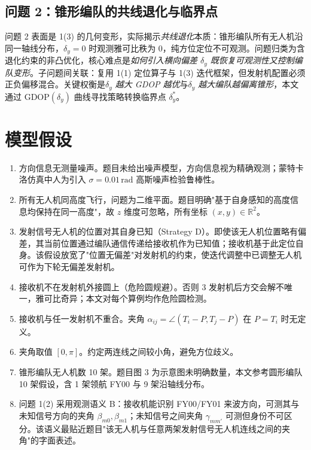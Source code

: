 \documentclass[12pt,a4paper]{ctexart}
\newcommand{\unit}[1]{\ensuremath{\,\mathrm{#1}}}
\begin{document}
\subsection{问题 2：锥形编队的共线退化与临界点}

问题 2 表面是 1(3) 的几何变形，实际揭示\emph{共线退化}本质：锥形编队所有无人机沿同一轴线分布，$\delta_y=0$ 时观测雅可比秩为 0，纯方位定位不可观测。问题归类为含退化约束的非凸优化，核心难点是\emph{如何引入横向偏差 $\delta_y$ 既恢复可观测性又控制编队变形}。子问题间关联：复用 1(1) 定位算子与 1(3) 迭代框架，但发射机配置必须正负偏移混合。关键权衡是\emph{$\delta_y$ 越大 GDOP 越优}与\emph{$\delta_y$ 越大编队越偏离锥形}，本文通过 GDOP$(\delta_y)$ 曲线寻找策略转换临界点 $\delta_y^*$。

\section{模型假设}

\begin{enumerate}[label=\textbf{A\arabic*.}, leftmargin=2.5em]
    \item 方向信息无测量噪声。题目未给出噪声模型，方向信息视为精确观测；蒙特卡洛仿真中人为引入 $\sigma=0.01\unit{rad}$ 高斯噪声检验鲁棒性。
    \item 所有无人机同高度飞行，问题为二维平面。题目明确"基于自身感知的高度信息均保持在同一高度"，故 $z$ 维度可忽略，所有坐标 $(x,y)\in\mathbb{R}^2$。
    \item 发射信号无人机的位置对其自身已知（Strategy D）。即使该无人机位置略有偏差，其当前位置通过编队通信传递给接收机作为已知值；接收机基于此定位自身。该假设放宽了"位置无偏差"对发射机的约束，使迭代调整中已调整无人机可作为下轮无偏差发射机。
    \item 接收机不在发射机外接圆上（危险圆规避）。否则 3 发射机后方交会解不唯一，雅可比奇异；本文对每个算例均作危险圆检测。
    \item 接收机与任一发射机不重合。夹角 $\alpha_{ij}=\angle(T_i-P,T_j-P)$ 在 $P=T_i$ 时无定义。
    \item 夹角取值 $[0,\pi]$。约定两连线之间较小角，避免方位歧义。
    \item 锥形编队无人机数 10 架。题目图 3 为示意图未明确数量，本文参考圆形编队 10 架假设，含 1 架领航 FY00 与 9 架沿轴线分布。
    \item 问题 1(2) 采用观测语义 B：接收机能识别 FY00/FY01 来波方向，可测其与未知信号方向的夹角 $\beta_{m0},\beta_{m1}$；未知信号之间夹角 $\gamma_{mm'}$ 可测但身份不可区分。该语义最贴近题目"该无人机与任意两架发射信号无人机连线之间的夹角"的字面表述。
\end{enumerate}
\end{document}
